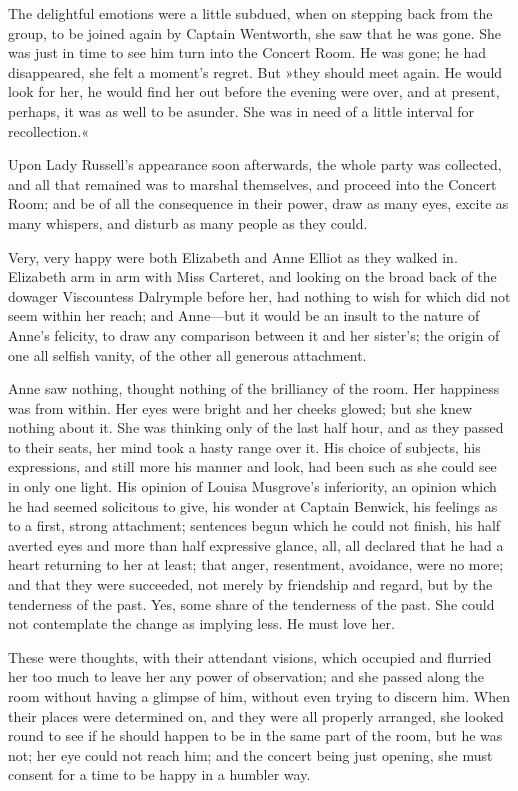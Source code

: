 The delightful emotions were a little subdued, when on stepping back from the group, to be joined again by Captain Wentworth, she saw that he was gone. She was just in time to see him turn into the Concert Room. He was gone; he had disappeared, she felt a moment's regret. But »they should meet again. He would look for her, he would find her out before the evening were over, and at present, perhaps, it was as well to be asunder. She was in need of a little interval for recollection.«

Upon Lady Russell's appearance soon afterwards, the whole party was collected, and all that remained was to marshal themselves, and proceed into the Concert Room; and be of all the consequence in their power, draw as many eyes, excite as many whispers, and disturb as many people as they could.

Very, very happy were both Elizabeth and Anne Elliot as they walked in. Elizabeth arm in arm with Miss Carteret, and looking on the broad back of the dowager Viscountess Dalrymple before her, had nothing to wish for which did not seem within her reach; and Anne—but it would be an insult to the nature of Anne's felicity, to draw any comparison between it and her sister's; the origin of one all selfish vanity, of the other all generous attachment.

Anne saw nothing, thought nothing of the brilliancy of the room. Her happiness was from within. Her eyes were bright and her cheeks glowed; but she knew nothing about it. She was thinking only of the last half hour, and as they passed to their seats, her mind took a hasty range over it. His choice of subjects, his expressions, and still more his manner and look, had been such as she could see in only one light. His opinion of Louisa Musgrove's inferiority, an opinion which he had seemed solicitous to give, his wonder at Captain Benwick, his feelings as to a first, strong attachment; sentences begun which he could not finish, his half averted eyes and more than half expressive glance, all, all declared that he had a heart returning to her at least; that anger, resentment, avoidance, were no more; and that they were succeeded, not merely by friendship and regard, but by the tenderness of the past. Yes, some share of the tenderness of the past. She could not contemplate the change as implying less. He must love her.

These were thoughts, with their attendant visions, which occupied and flurried her too much to leave her any power of observation; and she passed along the room without having a glimpse of him, without even trying to discern him. When their places were determined on, and they were all properly arranged, she looked round to see if he should happen to be in the same part of the room, but he was not; her eye could not reach him; and the concert being just opening, she must consent for a time to be happy in a humbler way.

